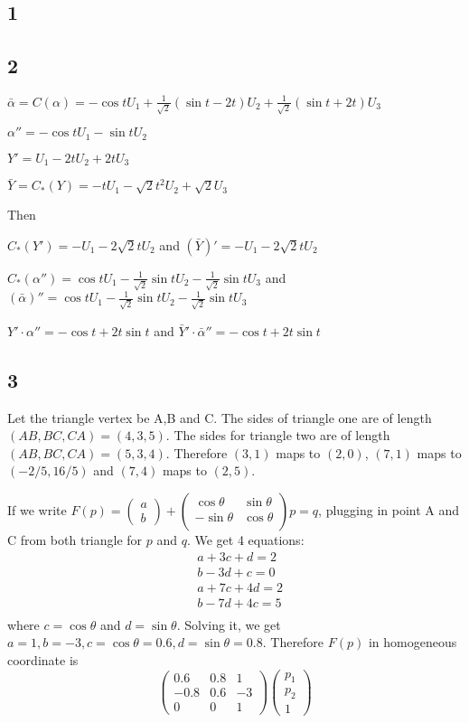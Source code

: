 \documentclass[12pt]{article}
\begin{document}
\subsection*{1}

\subsection*{2}
$\bar{\alpha} = C(\alpha) = -\cos t U_1 + \frac{1}{\sqrt{2}}(\sin t - 2t)U_2 +  \frac{1}{\sqrt{2}}(\sin t + 2t)U_3$ 

$\alpha'' = -\cos t U_1  -\sin t U_2$

$ Y' = U_1 - 2t U_2 + 2t U_3 $

$\bar{Y} = C_*(Y) = -t U_1 - \sqrt{2}t^2 U_2 + \sqrt{2}U_3$

Then 

$ C_*(Y') =- U_1 - 2\sqrt{2} tU_2 $ and $(\bar{Y})' = -U_1 -2\sqrt{2}t U_2$

$C_*(\alpha'') = \cos t U_1 - \frac{1}{\sqrt{2}} \sin t U_2 - \frac{1}{\sqrt{2}} \sin t U_3$ and $(\bar{\alpha})'' = \cos t U_1 - \frac{1}{\sqrt{2}} \sin t U_2 - \frac{1}{\sqrt{2}} \sin t U_3$

$Y'\cdot \alpha'' = -\cos t + 2t \sin t$ and $\bar{Y}' \cdot \bar{\alpha}'' = - \cos t  + 2t\sin t  $

\subsection*{3}
Let the triangle vertex be A,B and C. The sides of triangle one are of length $(AB, BC, CA) = (4, 3, 5)$. The sides for triangle two are of length $(AB, BC, CA) = (5, 3, 4) $. Therefore $(3, 1)$ maps to $(2, 0)$, $(7, 1)$ maps to $(-2/5, 16/5)$ and $(7, 4)$ maps to $(2, 5)$.

If we write $F(p) = \begin{pmatrix}
	a \\ b
\end{pmatrix} + \begin{pmatrix}
\cos \theta & \sin \theta \\
-\sin \theta & \cos \theta \\
\end{pmatrix} p = q
$, plugging in point A and C from both triangle for $p$ and $q$.  We get 4 equations: $$
  \begin{aligned}
  	&a + 3c + d = 2\\
  	&b - 3d + c = 0\\
  	&a + 7c + 4d = 2 \\
  	&b - 7d + 4c = 5 \\
  \end{aligned}
$$
where $c = \cos \theta$ and $d = \sin \theta$. Solving it, we get $a = 1, b = -3, c=\cos\theta = 0.6, d = \sin \theta = 0.8$.
Therefore $F(p)$ in homogeneous coordinate is $$ \begin{pmatrix}
	0.6 & 0.8 & 1 \\
	-0.8 & 0.6 & -3 \\
	0 & 0 & 1
\end{pmatrix} \begin{pmatrix}
 p_1 \\ p_2 \\ 1
\end{pmatrix}$$
\end{document}
